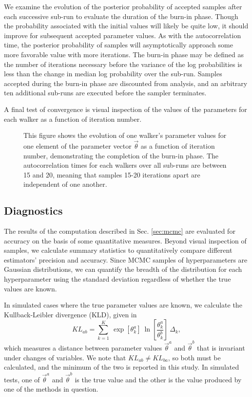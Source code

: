 \documentclass[preprint]{aastex}
\begin{document}
We examine the evolution of the posterior probability of accepted samples after 
each successive sub-run to evaluate the duration of the burn-in phase.  Though 
the probability associated with the initial values will likely be quite low, it 
should improve for subsequent accepted parameter values.  As with the 
autocorrelation time, the posterior probability of samples will asymptotically 
approach some more favorable value with more iterations.  The burn-in phase may 
be defined as the number of iterations necessary before the variance of the log 
probabilities is less than the change in median log probability over the 
sub-run.  Samples accepted during the burn-in phase are discounted from 
analysis, and an arbitrary ten additional sub-runs are executed before the 
sampler terminates.  

A final test of convergence is visual inspection of the values of the 
parameters for each walker as a function of iteration number.  

\begin{figure}
\caption{This figure shows the evolution of one walker's parameter values for 
one element of the parameter vector $\vec{\theta}$ as a function of iteration 
number, demonstrating the completion of the burn-in phase.  The autocorrelation 
times for each walkers over all sub-runs are between 15 and 20, meaning that 
samples 15-20 iterations apart are independent of one another.}
\label{fig:chains}
\end{figure}

\subsection{Diagnostics}
\label{sec:diag}

The results of the computation described in Sec. \ref{sec:mcmc} are evaluated 
for accuracy on the basis of some quantitative measures.  Beyond visual 
inspection of samples, we calculate summary statistics to quantitatively 
compare different estimators' precision and accuracy.  Since MCMC samples of 
hyperparameters are Gaussian distributions, we can quantify the breadth of the 
distribution for each hyperparameter using the standard deviation regardless of 
whether the true values are known.  

In simulated cases where the true parameter values are known, we calculate the 
Kullback-Leibler divergence (KLD), given in \begin{equation}\label{eq:kl} 
KL_{ab} = \sum_{k=1}^{K}\ \exp[\theta_{k}^{a}]\ 
\ln\left[\frac{\theta_{k}^{a}}{\theta_{k}^{b}}\right]\ 
\Delta_{k},\end{equation} which measures a distance between parameter values 
$\vec{\theta}^{a}$ and $\vec{\theta}^{b}$ that is invariant under changes of 
variables.  We note that $KL_{ab}\neq KL_{ba}$, so both must be calculated, and 
the minimum of the two is reported in this study.  In simulated tests, one of 
$\vec{\theta}^{a}$ and $\vec{\theta}^{b}$ is the true value and the other is 
the value produced by one of the methods in question.  
\end{document}

